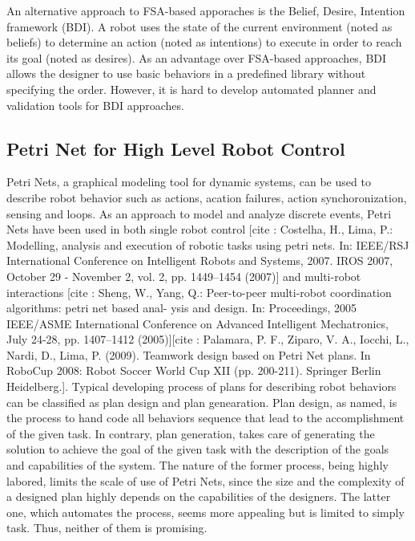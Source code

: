 \documentclass[12pt,a4paper,twocolumn]{article}
\begin{document}
An alternative approach to FSA-based apporaches is the Belief, Desire, Intention framework (BDI). A robot uses the state of the current environment (noted as beliefs) to determine an action (noted as intentions) to execute in order to reach its goal (noted as desires). As an advantage over FSA-based approaches, BDI allows the designer to use basic behaviors in a predefined library without specifying the order. However, it is hard to develop automated planner and validation tools for BDI approaches.  

\subsection{Petri Net for High Level Robot Control}

Petri Nets, a graphical modeling tool for dynamic systems, can be used to describe robot behavior such as actions, acation failures, action synchoronization, sensing and loops. As an approach to model and analyze discrete events, Petri Nets have been used in both single robot control [cite : Costelha, H., Lima, P.: Modelling, analysis and execution of robotic tasks using petri nets. In: IEEE/RSJ International Conference on Intelligent Robots and Systems, 2007. IROS 2007, October 29 - November 2, vol. 2, pp. 1449–1454 (2007)] and multi-robot interactions [cite : Sheng, W., Yang, Q.: Peer-to-peer multi-robot coordination algorithms: petri net based anal- ysis and design. In: Proceedings, 2005 IEEE/ASME International Conference on Advanced Intelligent Mechatronics, July 24-28, pp. 1407–1412 (2005)][cite : Palamara, P. F., Ziparo, V. A., Iocchi, L., Nardi, D., Lima, P. (2009). Teamwork design based on Petri Net plans. In RoboCup 2008: Robot Soccer World Cup XII (pp. 200-211). Springer Berlin Heidelberg.]. Typical developing process of plans for describing robot behaviors can be classified as plan design and plan genearation. Plan design, as named, is the process to hand code all behaviors sequence that lead to the accomplishment of the given task. In contrary, plan generation, takes care of generating the solution to achieve the goal of the given task with the description of the goals and capabilities of the system. The nature of the former process, being highly labored, limits the scale of use of Petri Nets, since the size and the complexity of a designed plan highly depends on the capabilities of the designers. The latter one, which automates the process, seems more appealing but is limited to simply task. Thus, neither of them is promising. 
\end{document}

